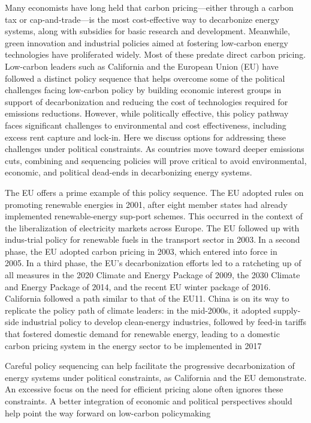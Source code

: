\documentclass[
]{book}
\begin{document}
Many economists have long held that carbon pricing---either through a carbon tax or cap-and-trade---is the most cost-effective way to decarbonize energy systems, along with subsidies for basic research and development. Meanwhile, green innovation and industrial policies aimed at fostering low-carbon energy technologies have proliferated widely. Most of these predate direct carbon pricing. Low-carbon leaders such as California and the European Union (EU) have followed a distinct policy sequence that helps overcome some of the political challenges facing low-carbon policy by building economic interest groups in support of decarbonization and reducing the cost of technologies required for emissions reductions. However, while politically effective, this policy pathway faces significant challenges to environmental and cost effectiveness, including excess rent capture and lock-in. Here we discuss options for addressing these challenges under political constraints. As countries move toward deeper emissions cuts, combining and sequencing policies will prove critical to avoid environmental, economic, and political dead-ends in decarbonizing energy systems.

The EU offers a prime example of this policy sequence. The EU adopted rules on promoting renewable energies in 2001, after eight member states had already implemented renewable-energy sup-port schemes. This occurred in the context of the liberalization of electricity markets across Europe. The EU followed up with indus-trial policy for renewable fuels in the transport sector in 2003.In a second phase, the EU adopted carbon pricing in 2003, which entered into force in 2005.In a third phase, the EU's decarbonization efforts led to a ratcheting up of all measures in the 2020 Climate and Energy Package of 2009, the 2030 Climate and Energy Package of 2014, and the recent EU winter package of 2016. California followed a path similar to that of the EU11. China is on its way to replicate the policy path of climate leaders: in the mid-2000s, it adopted supply-side industrial policy to develop clean-energy industries, followed by feed-in tariffs that fostered domestic demand for renewable energy, leading to a domestic carbon pricing system in the energy sector to be implemented in 2017

Careful policy sequencing can help facilitate the progressive decarbonization of energy systems under political constraints, as California and the EU demonstrate. An excessive focus on the need for efficient pricing alone often ignores these constraints. A better integration of economic and political perspectives should help point the way forward on low-carbon policymaking
\end{document}
